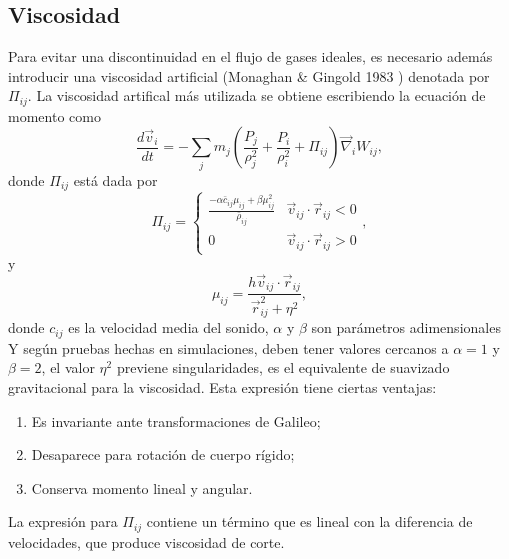 \documentclass[a4paper,openright,12pt]{book}
\begin{document}
\subsection{Viscosidad}
Para evitar una discontinuidad en el flujo de gases ideales, es necesario además introducir una viscosidad artificial (Monaghan \& Gingold 1983 \cite{b9.2}) denotada por $\Pi_{ij}$. La viscosidad artifical más utilizada se obtiene escribiendo la ecuación de momento como
\begin{equation}
\frac{d \vec{v}_{i}}{d t}
=
- \sum_{j} m_{j} 
\left(\frac{P_{j}}{\rho_{j}^{2}}+ \frac{P_{i}}{\rho_{i}^{2}} + \Pi_{ij}\right)
\vec{\nabla}_{i}W_{ij}, \label{eqn 2.40}
\end{equation}
donde $\Pi_{ij}$ está dada por
\begin{equation}
\Pi_{ij} = \left\lbrace
\begin{array}{ll}
\frac{-\alpha \bar{c}_{ij}\mu_{ij}+\beta\mu_{ij}^{2}}{\bar{\rho}_{ij}}  & \vec{v}_{ij}\cdot\vec{r}_{ij} < 0\\

0  & \vec{v}_{ij}\cdot\vec{r}_{ij} > 0
\end{array}
\right.,\label{eqn 2.41}
\end{equation}
y 
\begin{equation}
\mu_{ij}=\frac{h\vec{v}_{ij}\cdot\vec{r}_{ij}}{\vec{r}_{ij}^{2}+\eta^{2}},\label{eqn 2.42}
\end{equation}
donde $c_{ij}$ es la velocidad media del sonido, $\alpha$ y $\beta$ son parámetros adimensionales Y según pruebas hechas en simulaciones, deben tener valores cercanos a $\alpha=1$ y $\beta=2$, el valor $\eta^{2}$ previene singularidades, es el equivalente de suavizado gravitacional para la viscosidad. Esta expresión tiene ciertas ventajas:
\begin{enumerate}
\item Es invariante ante transformaciones de Galileo;
\item Desaparece para rotación de cuerpo rígido;
\item Conserva momento lineal y angular.
\end{enumerate}
La expresión para $\Pi_{ij}$ contiene un término que es lineal con la diferencia de velocidades, que produce viscosidad de corte.
\end{document}
